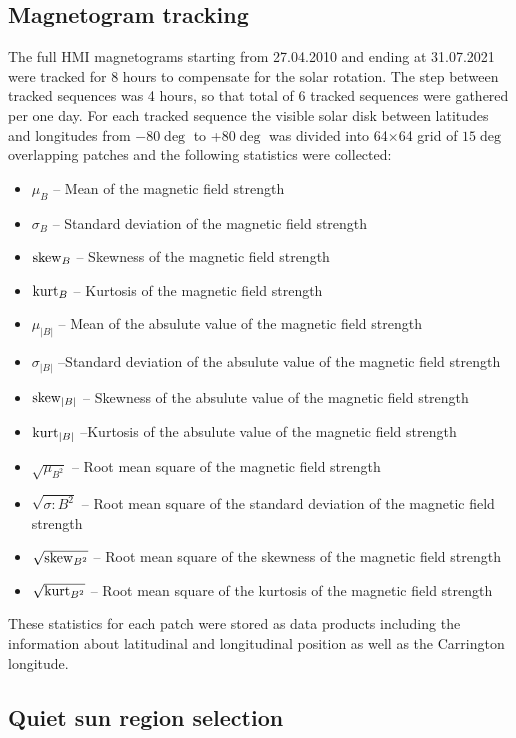 \documentclass[twocolumn,linenumbers,trackchanges]{aastex631}
\begin{document}
\subsection{Magnetogram tracking}
The full HMI magnetograms starting from 27.04.2010 and ending at 31.07.2021 were tracked for 8 hours to compensate for the solar rotation. The step between tracked sequences was 4 hours, so that total of 6 tracked sequences were gathered per one day. For each tracked sequence the visible solar disk between latitudes and longitudes from $-80\deg$ to +$80\deg$ was divided into 64$\times$64 grid of $15\deg$ overlapping patches and the following statistics were collected:
\begin{itemize}
	\item $\mu_B$ -- Mean of the magnetic field strength
	\item $\sigma_B$ -- Standard deviation of the magnetic field strength
	\item ${\rm skew}_B$ -- Skewness of the magnetic field strength
	\item ${\rm kurt}_B$ -- Kurtosis of the magnetic field strength
	\item $\mu_{|B|}$ -- Mean of the absulute value of the magnetic field strength
    \item $\sigma_{|B|}$ --Standard deviation of the absulute value of the magnetic field strength
    \item ${\rm skew}_{|B|}$ -- Skewness of the absulute value of the magnetic field strength
    \item ${\rm kurt}_{|B|}$ --Kurtosis of the absulute value of the magnetic field strength
	\item $\sqrt{\mu_{B^2}}$ -- Root mean square of the magnetic field strength
    \item $\sqrt{\sigma:{B^2}}$ -- Root mean square of the standard deviation of the magnetic field strength
    \item $\sqrt{{\rm skew}_{B^2}}$ -- Root mean square of the skewness of the magnetic field strength
    \item $\sqrt{{\rm kurt}_{B^2}}$ -- Root mean square of the kurtosis of the magnetic field strength
\end{itemize}
These statistics for each patch were stored as data products including the information about latitudinal and longitudinal position as well as the Carrington longitude.

\subsection{Quiet sun region selection}
\end{document}
